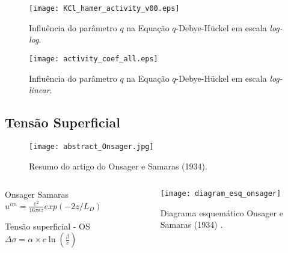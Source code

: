 \documentclass{beamer}
\begin{document}
\begin{frame}
\begin{figure}
\centering
  \texttt{[image: KCl\_hamer\_activity\_v00.eps]}
	\caption{Influência do parâmetro $q$ na Equação $q$-Debye-H\"{u}ckel em escala {\it log-log}.}
\end{figure}
\end{frame}

\begin{frame}
\begin{figure}
\centering
  \texttt{[image: activity\_coef\_all.eps]}
	\caption{Influência do parâmetro $q$ na Equação $q$-Debye-H\"{u}ckel em escala {\it log-linear}.}
\end{figure}
\end{frame}








\subsection{Tensão Superficial}

\begin{frame}
	\begin{figure}
 \centering
  \texttt{[image: abstract\_Onsager.jpg]}
		\caption{Resumo do artigo do Onsager e Samaras (1934).}
	\end{figure}
\end{frame}

\begin{frame}
	\begin{columns}
		\begin{column}{3.5cm}
	\begin{block}{Onsager Samaras}
	$	u^{im} = \frac{e^2}{16\pi \epsilon z } exp(-2z/L_D )$
	\end{block}
			\begin{block}{Tensão superficial - OS}
			       $\Delta \sigma = \alpha \times c \ln(\frac{\beta}{c})$ 
			\end{block}
		\end{column}
		\begin{column}{6.0cm}
	\begin{figure}
 \centering
  \texttt{[image: diagram\_esq\_onsager]}
		\caption{Diagrama esquemático Onsager e Samaras (1934) .}
	\end{figure}

		\end{column}
	\end{columns}
\end{frame}
\end{document}
